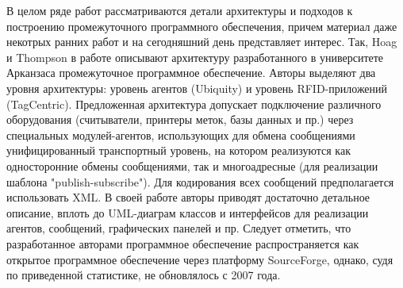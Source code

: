 В целом ряде работ рассматриваются детали архитектуры и подходов к построению промежуточного программного обеспечения, причем материал даже некотрых ранних работ и на сегодняшний день представляет интерес. Так, Hoag и Thompson в работе \cite{Hoag2006} описывают архитектуру разработанного в университете Арканзаса промежуточное программное обеспечение. Авторы выделяют два уровня архитектуры: уровень агентов (Ubiquity) и уровень RFID-приложений (TagCentric). Предложенная архитектура допускает подключение различного оборудования (считыватели, принтеры меток, базы данных и пр.) через специальных модулей-агентов, использующих для обмена сообщениями унифицированный транспортный уровень, на котором реализуются как односторонние обмены сообщениями, так и многоадресные (для реализации шаблона "publish-subscribe"). Для кодирования всех сообщений предполагается использовать XML. В своей работе авторы приводят достаточно детальное описание, вплоть до UML-диаграм классов и интерфейсов для реализации агентов, сообщений, графических панелей и пр. Следует отметить, что разработанное авторами программное обеспечение распространяется как открытое программное обеспечение через платформу SourceForge, однако, судя по приведенной статистике, не обновлялось с 2007 года.

